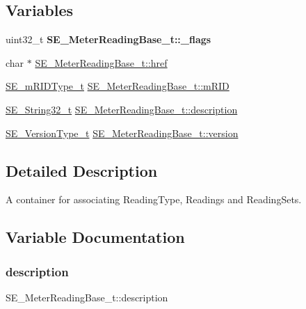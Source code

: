 \subsection*{Variables}
\begin{DoxyCompactItemize}
\item 
\mbox{\label{group__MeterReadingBase_ga22c5e47ef4af3a20faac2b4217402869}} 
uint32\+\_\+t {\bfseries S\+E\+\_\+\+Meter\+Reading\+Base\+\_\+t\+::\+\_\+flags}
\item 
char $\ast$ \hyperlink{group__MeterReadingBase_ga9f76ab492ecd22bec26e715a88738b88}{S\+E\+\_\+\+Meter\+Reading\+Base\+\_\+t\+::href}
\item 
\hyperlink{group__mRIDType_gac74622112f3a388a2851b2289963ba5e}{S\+E\+\_\+m\+R\+I\+D\+Type\+\_\+t} \hyperlink{group__MeterReadingBase_gae4ef9b5a1be0798622ffcbc81eab7647}{S\+E\+\_\+\+Meter\+Reading\+Base\+\_\+t\+::m\+R\+ID}
\item 
\hyperlink{group__String32_gac9f59b06b168b4d2e0d45ed41699af42}{S\+E\+\_\+\+String32\+\_\+t} \hyperlink{group__MeterReadingBase_ga9d6cd403c20c11642dd443f5a0052282}{S\+E\+\_\+\+Meter\+Reading\+Base\+\_\+t\+::description}
\item 
\hyperlink{group__VersionType_ga4b8d27838226948397ed99f67d46e2ae}{S\+E\+\_\+\+Version\+Type\+\_\+t} \hyperlink{group__MeterReadingBase_ga094a26177e2ad97f8e2d4d606df742fc}{S\+E\+\_\+\+Meter\+Reading\+Base\+\_\+t\+::version}
\end{DoxyCompactItemize}


\subsection{Detailed Description}
A container for associating Reading\+Type, Readings and Reading\+Sets. 

\subsection{Variable Documentation}
\mbox{\label{group__MeterReadingBase_ga9d6cd403c20c11642dd443f5a0052282}} 
\subsubsection{\texorpdfstring{description}{description}}
{\footnotesize\ttfamily S\+E\+\_\+\+Meter\+Reading\+Base\+\_\+t\+::description}

